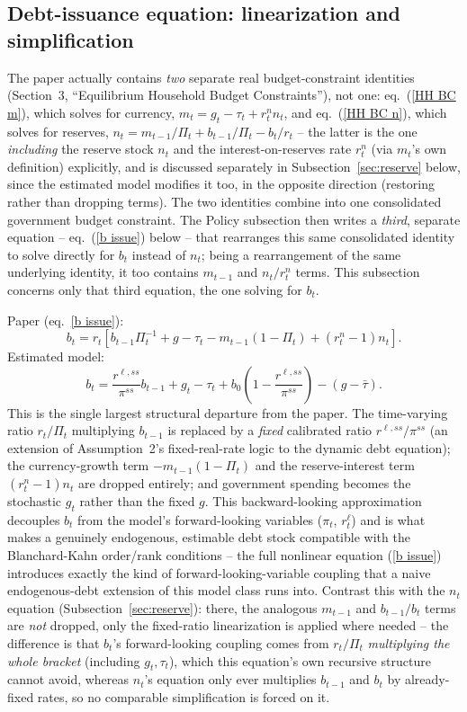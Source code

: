\documentclass[11pt]{article}
\begin{document}
\subsection{Debt-issuance equation: linearization and simplification}
\label{sec:debtissuance}
The paper actually contains \emph{two} separate real budget-constraint
identities (Section~3, ``Equilibrium Household Budget Constraints''),
not one: eq.~(\ref{HH BC m}), which solves for currency,
$m_t = g_t - \tau_t + r^n_t n_t$, and eq.~(\ref{HH BC n}), which solves
for reserves, $n_t = m_{t-1}/\Pi_t + b_{t-1}/\Pi_t - b_t/r_t$ -- the
latter is the one \emph{including} the reserve stock $n_t$ and the
interest-on-reserves rate $r^n_t$ (via $m_t$'s own definition) explicitly,
and is discussed separately in Subsection~\ref{sec:reserve} below,
since the estimated model modifies it too, in the opposite direction
(restoring rather than dropping terms). The two identities combine into
one consolidated government budget constraint. The Policy subsection
then writes a \emph{third}, separate equation -- eq.~(\ref{b issue})
below -- that rearranges this same consolidated identity to solve
directly for $b_t$ instead of $n_t$; being a rearrangement of the same
underlying identity, it too contains $m_{t-1}$ and $n_t/r^n_t$ terms.
This subsection concerns only that third equation, the one solving for
$b_t$.

Paper (eq.~\ref{b issue}):
\[
b_t = r_t\left[b_{t-1}\Pi_t^{-1} + g - \tau_t - m_{t-1}(1-\Pi_t) + (r^n_t-1)n_t\right].
\]
Estimated model:
\[
b_t = \frac{r^{\ell,ss}}{\pi^{ss}}b_{t-1} + g_t - \tau_t + b_0\left(1-\frac{r^{\ell,ss}}{\pi^{ss}}\right) - (g-\bar\tau).
\]
This is the single largest structural departure from the paper. The
time-varying ratio $r_t/\Pi_t$ multiplying $b_{t-1}$ is replaced by a
\emph{fixed} calibrated ratio $r^{\ell,ss}/\pi^{ss}$ (an extension of
Assumption~2's fixed-real-rate logic to the dynamic debt equation); the
currency-growth term $-m_{t-1}(1-\Pi_t)$ and the reserve-interest term
$(r^n_t-1)n_t$ are dropped entirely; and government spending becomes
the stochastic $g_t$ rather than the fixed $g$. This backward-looking
approximation decouples $b_t$ from the model's forward-looking
variables ($\pi_t$, $r^\ell_t$) and is what makes a genuinely
endogenous, estimable debt stock compatible with the Blanchard-Kahn
order/rank conditions -- the full nonlinear equation (\ref{b issue})
introduces exactly the kind of forward-looking-variable coupling that a
naive endogenous-debt extension of this model class runs into. Contrast
this with the $n_t$ equation (Subsection~\ref{sec:reserve}): there, the
analogous $m_{t-1}$ and $b_{t-1}/b_t$ terms are \emph{not} dropped, only
the fixed-ratio linearization is applied where needed -- the difference
is that $b_t$'s forward-looking coupling comes from $r_t/\Pi_t$
\emph{multiplying the whole bracket} (including $g_t,\tau_t$), which
this equation's own recursive structure cannot avoid, whereas $n_t$'s
equation only ever multiplies $b_{t-1}$ and $b_t$ by already-fixed
rates, so no comparable simplification is forced on it.
\end{document}
